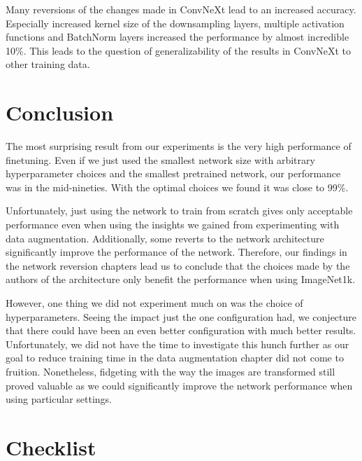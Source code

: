 \documentclass{article}
\begin{document}
Many reversions of the changes made in ConvNeXt lead to an increased accuracy.
Especially increased kernel size of the downsampling layers, multiple activation functions and BatchNorm layers increased the performance by almost incredible 10\%.
This leads to the question of generalizability of the results in ConvNeXt to other training data.



\section{Conclusion}\label{sec:conclusion}
The most surprising result from our experiments is the very high performance of finetuning.
Even if we just used the smallest network size with arbitrary hyperparameter choices and the smallest pretrained network, our performance was in the mid-nineties.
With the optimal choices we found it was close to 99\%.

Unfortunately, just using the network to train from scratch gives only acceptable performance even when using the insights we gained from experimenting with data augmentation.
Additionally, some reverts to the network architecture significantly improve the performance of the network.
Therefore, our findings in the network reversion chapters lead us to conclude that the choices made by the authors of the architecture only benefit the performance when using ImageNet1k.

However, one thing we did not experiment much on was the choice of hyperparameters.
Seeing the impact just the one configuration had, we conjecture that there could have been an even better configuration with much better results.
Unfortunately, we did not have the time to investigate this hunch further as our goal to reduce training time in the data augmentation chapter did not come to fruition.
Nonetheless, fidgeting with the way the images are transformed still proved valuable as we could significantly improve the network performance when using particular settings.
\printbibliography
\section*{Checklist}

\end{document}
